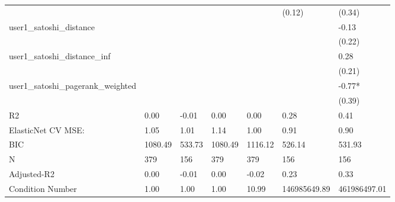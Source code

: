 \begin{table}
\begin{center}
\begin{tabular}{lllllll}
                                               &          &         &         &         & (0.12)       & (0.34)        \\
user1_satoshi_distance                         &          &         &         &         &              & -0.13         \\
                                               &          &         &         &         &              & (0.22)        \\
user1_satoshi_distance_inf                     &          &         &         &         &              & 0.28          \\
                                               &          &         &         &         &              & (0.21)        \\
user1_satoshi_pagerank_weighted                &          &         &         &         &              & -0.77*        \\
                                               &          &         &         &         &              & (0.39)        \\
R2                                             & 0.00     & -0.01   & 0.00    & 0.00    & 0.28         & 0.41          \\
ElasticNet CV MSE:                             & 1.05     & 1.01    & 1.14    & 1.00    & 0.91         & 0.90          \\
BIC                                            & 1080.49  & 533.73  & 1080.49 & 1116.12 & 526.14       & 531.93        \\
N                                              & 379      & 156     & 379     & 379     & 156          & 156           \\
Adjusted-R2                                    & 0.00     & -0.01   & 0.00    & -0.02   & 0.23         & 0.33          \\
Condition Number                               & 1.00     & 1.00    & 1.00    & 10.99   & 146985649.89 & 461986497.01  \\
\hline
\end{tabular}
\end{center}
\end{table}